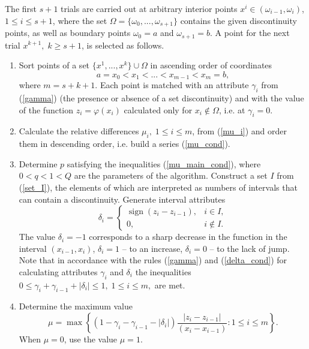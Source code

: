 \documentclass[runningheads]{llncs}
\newcommand{\sign}{\operatorname{sign}}
\begin{document}
The first $s+1$ trials are carried out at arbitrary interior points $x^i \in (\omega_{i-1},\omega_i )$,  $1 \leq i \leq s+1$, where the set $\Omega=\{\omega_0,...,\omega_{s+1}\}$ contains the given discontinuity points, as well as boundary points $\omega_0=a$ and $\omega_{s+1}=b$. A point for the next trial $x^{k+1}, \; k \geq s+1$, is selected as follows.

\begin{enumerate}
\item Sort points of a set $\{x^1,...,x^k\} \cup \Omega$ in ascending order of coordinates 
\begin{equation}\label{x_cond}
 a=x_0<x_1<...<x_{m-1}<x_m=b,
\end{equation}
where $m=s+k+1$. Each point is matched with an attribute $\gamma_i$ from (\ref{gamma}) (the presence or absence of a set discontinuity) and with the value of the function $z_i=\varphi(x_i)$ calculated only for $x_i \not\in \Omega$, i.e. at $\gamma_i=0$.

\item Calculate the relative differences $\mu_i, \; 1 \leq i \leq m$, from (\ref{mu_i}) and order them in descending order, i.e. build a series (\ref{mu_cond}).

\item Determine $p$ satisfying the inequalities (\ref{mu_main_cond}), where $0<q<1<Q$ are the parameters of the algorithm. Construct a set $I$ from (\ref{set_I}), the elements of which are interpreted as numbers of intervals that can contain a discontinuity. Generate interval attributes
\begin{equation}\label{delta_cond}
\delta_i=
\begin{cases}
	\sign{(z_i - z_{i-1})}, &\text{$i \in I$}, \\
	0, &\text{$i \not \in I$}.
\end{cases}
\end{equation}
The value $\delta_i=-1$ corresponds to a sharp decrease in the function in the interval $(x_{i-1},x_i)$, $\delta_i=1$ -- to an increase, $\delta_i=0$ -- to the lack of jump. Note that in accordance with the rules (\ref{gamma}) and (\ref{delta_cond}) for calculating attributes $\gamma_i$ and $\delta_i$ the inequalities
$ 0 \leq \gamma_i+\gamma_{i-1}+|\delta_i | \leq 1, \; 1 \leq i \leq m, $
are met.

\item Determine the maximum value
\begin{equation}\label{mu_new}
\mu=\max\left\{\left(1-\gamma_i-\gamma_{i-1}-|\delta_i|\right) \frac {|z_i-z_{i-1}|}{(x_i-x_{i-1})}: 1 \leq i \leq m\right\}.
\end{equation}
When $\mu=0$, use the value $\mu=1$.


\end{enumerate}
\end{document}

